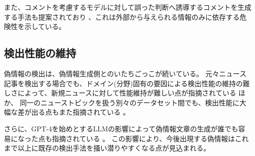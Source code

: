 また、コメントを考慮するモデルに対して誤った判断へ誘導するコメントを生成する手法も提案されており \cite{9338282}、これは外部から与えられる情報のみに依存する危険性を示している。

\subsection{検出性能の維持}
偽情報の検出は、偽情報生成側とのいたちごっこが続いている。
元々ニュース記事を検出する場合でも、ドメイン(分野)固有の要因による検出性能の維持の難しさによって、新規ニュースに対して性能維持が難しい点が指摘されている \cite{10.1145/3459637.3482139}ほか、
同一のニューストピックを扱う別々のデータセット間でも、検出性能に大幅な差が出る点もまた指摘されている \cite{10.1007/978-3-030-73696-5_13}。

さらに、GPT-4を始めとするLLMの影響によって偽情報文章の生成が誰でも容易になった点も指摘されている \cite{DWIVEDI2023102642}。
この影響により、今後出現する偽情報はこれまで以上に既存の検出手法を掻い潜りやすくなる点が見込まれる。

